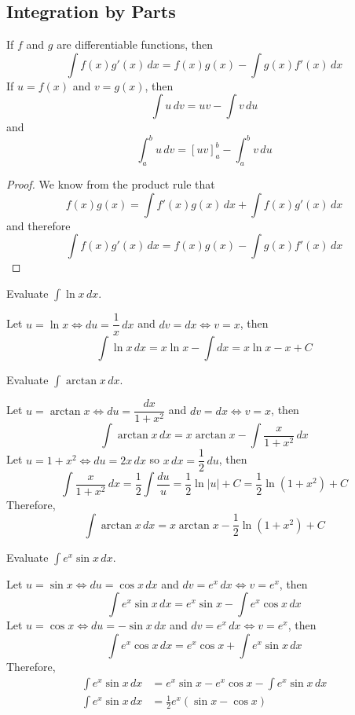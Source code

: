 \subsection{Integration by Parts}

\begin{theorem}
    If \(f\) and \(g\) are differentiable functions, then
    \[\int f(x)g'(x)\,dx=f(x)g(x)-\int g(x)f'(x)\,dx\]
    If \(u=f(x)\) and \(v=g(x)\), then
    \[\int u\,dv=uv-\int v\,du\]
    and
    \[\int_a^b u\,dv=[uv]_a^b-\int_a^b v\,du\]
\end{theorem}
\begin{proof}
    We know from the product rule that
    \[f(x)g(x)=\int f'(x)g(x)\,dx+\int f(x)g'(x)\,dx\]
    and therefore
    \[\int f(x)g'(x)\,dx=f(x)g(x)-\int g(x)f'(x)\,dx\]
\end{proof}
\begin{problem}
    Evaluate \(\displaystyle{\int\ln x\,dx}\).
\end{problem}
\begin{solution}
    Let \(u=\ln x\iff du=\dfrac{1}{x}\,dx\) and \(dv=dx\iff v=x\),
    then
    \[\int\ln x\,dx=x\ln x-\int dx=x\ln x-x+C\]
\end{solution}
\begin{problem}
    Evaluate \(\displaystyle{\int\arctan x\,dx}\).
\end{problem}
\begin{solution}
    Let \(u=\arctan x\iff du=\dfrac{dx}{1+x^2}\) and \(dv=dx\iff v=x\), then
    \[\int\arctan x\,dx=x\arctan x-\int\frac{x}{1+x^2}\,dx\]
    Let \(u=1+x^2\iff du=2x\,dx\) so \(x\,dx=\dfrac{1}{2}\,du\), then
    \[\int\frac{x}{1+x^2}\,dx=\frac{1}{2}\int\frac{du}{u}=\frac{1}{2}\ln|u|+C
    =\frac{1}{2}\ln(1+x^2)+C\]
    Therefore,
    \[\int\arctan x\,dx=x\arctan x-\frac{1}{2}\ln(1+x^2)+C\]
\end{solution}
\begin{problem}
    Evaluate \(\displaystyle{\int e^x\sin x\,dx}\).
\end{problem}
\begin{solution}
    Let \(u=\sin x\iff du=\cos x\,dx\) and \(dv=e^x\,dx\iff v=e^x\),
    then
    \[\int e^x\sin x\,dx=e^x\sin x-\int e^x\cos x\,dx\]
    Let \(u=\cos x\iff du=-\sin x\,dx\) and \(dv=e^x\,dx\iff v=e^x\),
    then
    \[\int e^x\cos x\,dx=e^x\cos x+\int e^x\sin x\,dx\]
    Therefore,
    \begin{align*}
        \int e^x\sin x\,dx &= e^x\sin x-e^x\cos x-\int e^x\sin x\,dx \\
        \int e^x\sin x\,dx &= \frac{1}{2}e^x(\sin x-\cos x) 
    \end{align*}
\end{solution}
